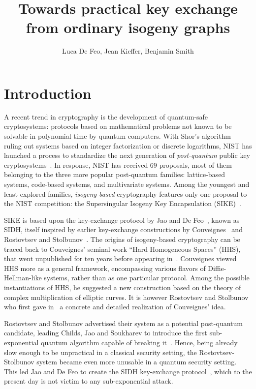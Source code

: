 \documentclass{article}
\title{Towards practical key exchange from ordinary isogeny graphs}
\author{Luca De Feo, Jean Kieffer, Benjamin Smith}
\theoremstyle{definition}
\begin{document}
\maketitle

\begin{abstract}
\end{abstract}

\section{Introduction}
\label{sec:introduction}

A recent trend in cryptography is the development of quantum-safe
cryptosystems: protocols based on mathematical problems not known to
be solvable in polynomial time by quantum computers. With Shor's
algorithm~\cite{shor1994algorithms} ruling out systems based on
integer factorization or discrete logarithms, NIST has launched a
process to standardize the next generation of \emph{post-quantum}
public key cryptosystems~\cite{NIST2016}. In response, NIST has
received 69 proposals, most of them belonging to the three more
popular post-quantum families: lattice-based systems, code-based
systems, and multivariate systems. Among the youngest and least
explored families, \emph{isogeny-based} cryptography features only one
proposal to the NIST competition: the Supersingular Isogeny Key
Encapsulation (SIKE)~\cite{SIKE}.

SIKE is based upon the key-exchange protocol by Jao and De
Feo~\cite{jao+defeo2011}, known as SIDH, itself inspired by earlier
key-exchange constructions by Couveignes~\cite{cryptoeprint:2006:291}
and Rostovtsev and
Stolbunov~\cite{rostovtsev+stolbunov06,stolbunov-red,Stol}. The
origins of isogeny-based cryptography can be traced back to
Couveignes' seminal work ``Hard Homogeneous Spaces'' (HHS), that went
unpublished for ten years before appearing
in~\cite{cryptoeprint:2006:291}. Couveignes viewed HHS more as a
general framework, encompassing various flavors of Diffie-Hellman-like
systems, rather than as one particular protocol. Among the possible
instantiations of HHS, he suggested a new construction based on the
theory of complex multiplication of elliptic curves. It is however
Rostovtsev and Stolbunov who first gave
in~\cite{rostovtsev+stolbunov06} a concrete and detailed realization
of Couveignes' idea.

Rostovtsev and Stolbunov advertised their system as a potential
post-quantum candidate, leading Childs, Jao and Soukharev to introduce
the first sub-exponential quantum algorithm capable of breaking
it~\cite{childs2014constructing}. Hence, being already slow enough to
be unpractical in a classical security setting, the
Rostovtsev-Stolbunov system became even more unusable in a quantum
security setting. This led Jao and De Feo to create the SIDH
key-exchange protocol~\cite{jao+defeo2011}, which to the present day
is not victim to any sub-exponential attack.
\end{document}

